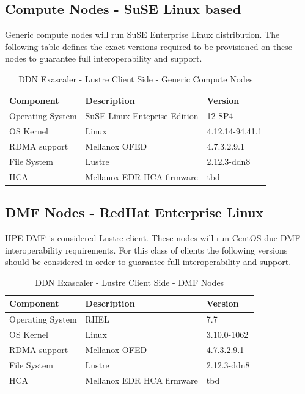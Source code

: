 \documentclass{article}
\begin{document}
\subsection{Compute Nodes - SuSE Linux based}
Generic compute nodes will run SuSE Enterprise Linux distribution. The following table defines the exact versions required to be provisioned on these nodes to guarantee full interoperability and support. 
\begin{table}[h]
 \centering
 \begin{tabular}{||l l l||}
 \hline
 \textbf{Component} & \textbf{Description} & \textbf{Version} \\ [0.5ex] 
 \hline\hline
 Operating System & SuSE Linux Enteprise Edition & 12 SP4\\ 
 \hline
 OS Kernel & Linux & 4.12.14-94.41.1 \\
 \hline
 RDMA support & Mellanox OFED & 4.7.3.2.9.1 \\
 \hline
 File System & Lustre & 2.12.3-ddn8 \\
 \hline
 HCA & Mellanox EDR HCA firmware & tbd \\
 \hline
 \end{tabular}
 \caption{DDN Exascaler - Lustre Client Side - Generic Compute Nodes}
 \label{tab:os-compat-clientside-generic}
\end{table}

\subsection{DMF Nodes - RedHat Enterprise Linux}
HPE DMF is considered Lustre client. These nodes will run CentOS due DMF interoperability requirements. For this class of clients the following versions should be considered in order to guarantee full interoperability and support.

\begin{table}[h]
 \centering
 \begin{tabular}{||l l l||}
 \hline
 \textbf{Component} & \textbf{Description} & \textbf{Version} \\ [0.5ex] 
 \hline\hline
 Operating System & RHEL & 7.7\\ 
 \hline
 OS Kernel & Linux & 3.10.0-1062 \\
 \hline
 RDMA support & Mellanox OFED & 4.7.3.2.9.1 \\
 \hline
 File System & Lustre & 2.12.3-ddn8 \\
 \hline
 HCA & Mellanox EDR HCA firmware & tbd \\
 \hline
 \end{tabular}
 \caption{DDN Exascaler - Lustre Client Side - DMF Nodes}
 \label{tab:os-compat-clientside-dmf}
\end{table}
\end{document}
